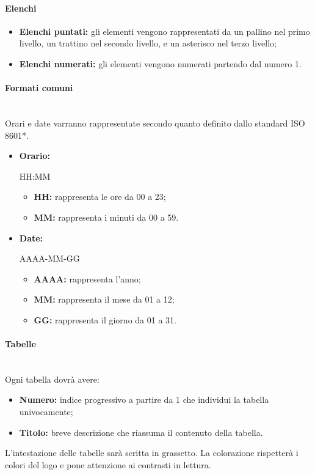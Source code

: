 \documentclass[11pt,a4paper]{article}
\begin{document}
	\paragraph{Elenchi}
	\begin{itemize}
	\item \textbf{Elenchi puntati:} gli elementi vengono rappresentati da un pallino nel primo livello, un trattino nel secondo livello, e un asterisco nel terzo livello; 
	\item \textbf{Elenchi numerati:} gli elementi vengono numerati partendo dal numero 1.
	\end{itemize}

	\paragraph{Formati comuni}
	\noindent \\ 
	Orari e date varranno rappresentate secondo quanto definito dallo standard ISO 8601*. 

	\begin{itemize}
	\item \textbf{Orario:} 
	\begin{center}
		HH:MM
	\end{center}
	\begin{itemize}
		\item \textbf{HH:} rappresenta le ore da 00 a 23;
		\item \textbf{MM:} rappresenta i minuti da 00 a 59.
	\end{itemize} 

	\item \textbf{Date:}
	\begin{center}
		AAAA-MM-GG
	\end{center}
	\begin{itemize}
	\item \textbf{AAAA:} rappresenta l'anno;
	\item \textbf{MM:} rappresenta il mese da 01 a 12;
	\item \textbf{GG:} rappresenta il giorno da 01 a 31.
	\end{itemize}

	\end{itemize}
	
	\paragraph{Tabelle}	
\noindent \\		
	Ogni tabella dovrà avere:
	\begin{itemize}
	\item \textbf{Numero:} indice progressivo a partire da 1 che individui la tabella univocamente;
	\item \textbf{Titolo:} breve descrizione che riassuma il contenuto della tabella.
	\end{itemize}
L'intestazione delle tabelle sarà scritta in grassetto. La colorazione rispetterà i colori del logo e pone attenzione ai contrasti in lettura.
\end{document}
